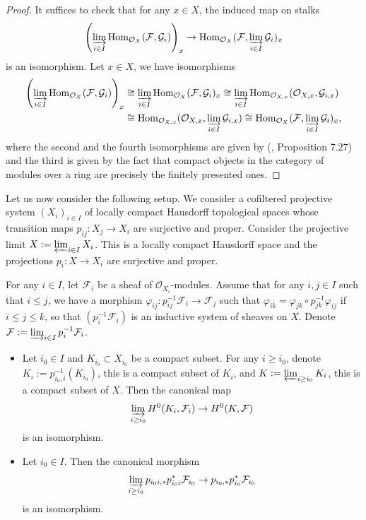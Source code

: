 \documentclass [11pt,reqno]{amsart}
\newcommand{\1}{\mathmybb{1}}
\def\cF{{\mathcal{F}}}
\def\cG{{\mathcal{G}}}
\def\cO{{\mathcal{O}}}
\def\Hom{\operatorname{Hom}}
\begin{document}
\begin{proof}
It suffices to check that for any $x\in X$, the induced map on stalks
\begin{align*}
\left(\displaystyle\varinjlim_{i\in I}\Hom_{\cO_{X}}(\cF,\cG_{i})\right)_{x} \to \Hom_{\cO_{X}}(\cF,\varinjlim_{i\in I}\cG_{i})_{x}
\end{align*}
is an isomorphism. Let $x\in X$, we have isomorphisms
\begin{align*}
\left(\displaystyle\varinjlim_{i\in I}\Hom_{\cO_{X}}(\cF,\cG_{i})\right)_{x}&\cong\varinjlim_{i\in I}\Hom_{\cO_{X}}(\cF,\cG_{i})_{x} \cong \varinjlim_{i\in I}\Hom_{\cO_{X,x}}(\cO_{X,x},\cG_{i,x})\\ 
&\cong \Hom_{\cO_{X,x}}(\cO_{X,x},\varinjlim_{i\in I}\cG_{i,x}) \cong \Hom_{\cO_{X}}(\cF,\varinjlim_{i\in I}\cG_{i})_{x},
\end{align*}
where the second and the fourth isomorphisms are given by (\cite{Gortz10}, Proposition 7.27) and the third is given by the fact that compact objects in the category of modules over a ring are precisely the finitely presented ones. 
\end{proof}

Let us now consider the following setup. We consider a cofiltered projective system $(X_{i})_{i\in I}$ of locally compact Hausdorff topological spaces whose transition maps $p_{ij}:X_{j}\to X_{i}$ are surjective and proper. Consider the projective limit $X:=\varprojlim_{i\in I}X_{i}$. This is a locally compact Hausdorff space and the projections $p_{i}:X\to X_{i}$ are surjective and proper. 

\begin{proposition}
\label{prop:abstract_nonsense_sheaves_of_modules_projective_limit}
For any $i\in I$, let $\cF_{i}$ be a sheaf of $\cO_{X_{i}}$-modules. Assume that for any $i,j\in I$ such that $i\leq j$, we have a morphism $\varphi_{ij}:p_{ij}^{-1}\cF_{i}\to\cF_{j}$ such that $\varphi_{ik}=\varphi_{jk}\circ p_{jk}^{-1}\varphi_{ij}$ if $i\leq j \leq k$, so that $(p_{i}^{-1}\cF_{i})$ is an inductive system of sheaves on $X$. Denote $\cF:=\varinjlim_{i\in I}p_{i}^{-1}\cF_{i}$. 
\begin{itemize}
	\item[(1)] Let $i_{0}\in I$ and $K_{i_{0}}\subset X_{i_{0}}$ be a compact subset. For any $i\geq i_{0}$, denote $K_{i}:=p_{i_{0},i}^{-1}(K_{i_{0}})$, this is a compact subset of $K_{i}$, and $K:=\varprojlim_{i\geq i_{0}}K_{i}$, this is a compact subset of $X$. Then the canonical map
	\begin{align*}
	\displaystyle\varinjlim_{i\geq i_{0}}H^{0}(K_{i},\cF_{i}) \to H^{0}(K,\cF)
	\end{align*}
	is an isomorphism.
	\item[(2)] Let $i_{0}\in I$. Then the canonical morphism 
	\begin{align*}
	\displaystyle\varinjlim_{i\geq i_{0}}p_{i_{0}i,\ast}p_{i_{0}i}^{\ast}\cF_{i_{0}} \to p_{i_{0},\ast}p_{i_{0}}^{\ast}\cF_{i_{0}}
	\end{align*}
	is an isomorphism.
\end{itemize}
\end{proposition}
\end{document}
